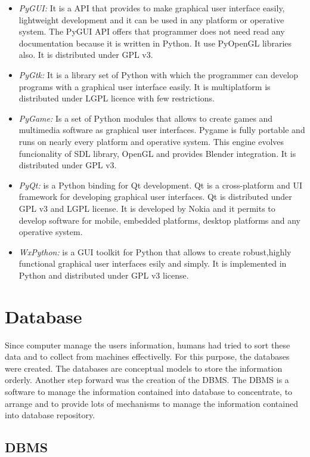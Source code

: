 \begin{itemize}
\item \emph {PyGUI:} It is a API that provides to make graphical user interface
  easily, lightweight development and it can be used in any platform or
  operative system. The PyGUI API offers that programmer does
  not need read any documentation because it is written in Python. It use
  PyOpenGL libraries also. It is distributed under GPL v3.
\item \emph{PyGtk:} It is a library set of Python with which the programmer can
  develop  programs with a graphical user interface easily. It is multiplatform
  is distributed under LGPL licence with few restrictions.
\item \emph{PyGame:} Is a set of Python modules that allows to create games and
  multimedia software as graphical user interfaces. Pygame is fully portable and
  runs on nearly every platform and operative system. This engine evolves
  funcionality of SDL library, OpenGL and provides Blender integration. It is
  distributed under GPL v3.
\item \emph{PyQt:} is a Python binding for Qt development. Qt is a
  cross-platform  and UI framework for  developing graphical user interfaces. Qt
  is distributed under GPL v3 and LGPL license. It is developed by Nokia and it
  permits to develop software for mobile, embedded platforms, desktop platforms
  and any operative system.
\item \emph{WxPython:} is a GUI toolkit for Python that allows to create
  robust,highly functional graphical user interfaces esily and simply. It is
  implemented in Python and distributed under GPL v3 license.
\end{itemize}


\section{Database}
Since computer manage the users information, humans had tried to sort these data
and to collect from machines effectivelly. For this purpose, the databases were
created. The databases are conceptual models to store the information
orderly. Another step forward was the creation of the \ac{DBMS}. The \ac{DBMS}
is a software to manage the information contained into database to concentrate,
to arrange and to provide lots of mechanisms to manage the information contained
into database repository.

\subsection{DBMS}

